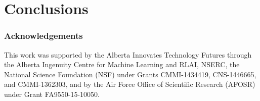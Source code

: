 \documentclass[twoside, 11pt]{article}
\begin{document}
\section{Conclusions}
\label{sec:conc}


\appendix






\subsubsection*{Acknowledgements}
This work was supported by the Alberta Innovates Technology Futures through the Alberta Ingenuity Centre for Machine Learning and RLAI, NSERC, the National Science Foundation (NSF) under Grants CMMI-1434419, CNS-1446665, and CMMI-1362303, and by the Air Force Office of Scientific Research (AFOSR) under Grant FA9550-15-10050.

%


\end{document}
